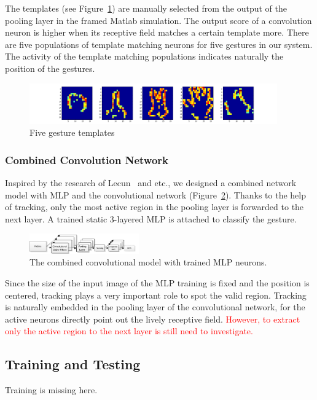 \documentclass[journal]{journal}
\begin{document}
The templates (see Figure~\ref{fig:template}) are manually selected from the output of the pooling layer in the framed Matlab simulation. 
The output score of a convolution neuron is higher when its receptive field matches a certain template more. 
There are five populations of template matching neurons for five gestures in our system. 
The activity of the template matching populations indicates naturally the position of the gestures.

\begin{figure}
\centering
	\includegraphics[width=0.95\textwidth]{pics/guesture.png}
	\caption{Five gesture templates}
	\label{fig:template}
\end{figure}

\subsubsection{Combined Convolution Network}
Inspired by the research of Lecun~\cite{lecun1998gradient} and etc., we designed a combined network model with MLP and the convolutional network (Figure~\ref{fig:model2}). 
Thanks to the help of tracking, only the most active region in the pooling layer is forwarded to the next layer. 
A trained static 3-layered MLP is attached to classify the gesture.

\begin{figure}
\centering
	\includegraphics[width=0.42\textwidth]{pics/model2.pdf}
	\caption{The combined convolutional model with trained MLP neurons.}
	\label{fig:model2}
\end{figure}

Since the size of the input image of the MLP training is fixed and the position is centered, tracking plays a very important role to spot the valid region. 
Tracking is naturally embedded in the pooling layer of the convolutional network, for the active neurons directly point out the lively receptive field. 
\textcolor{red}{However, to extract only the active region to the next layer is still need to investigate.}

\subsection{Training and Testing}
\label{sec:tat}
Training is missing here.
\end{document}
